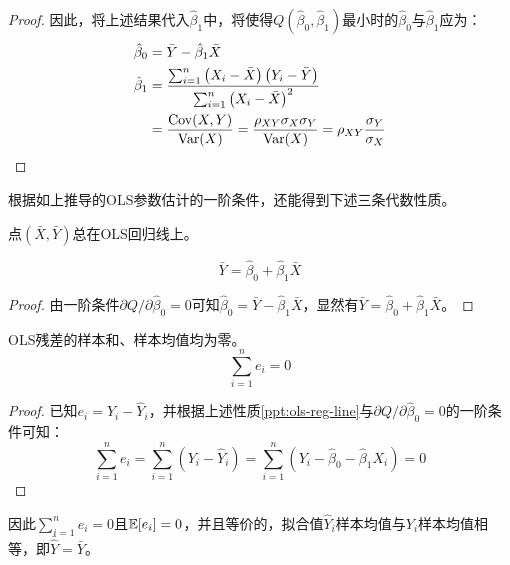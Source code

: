\documentclass[11pt]{article}
\begin{document}
\begin{proof}
因此，将上述结果代入$\hat{\beta}_1$中，将使得$Q(\hat{\beta}_0,\hat{\beta}_1)$最小时的$\hat{\beta}_0$与$\hat{\beta}_1$应为：
\begin{align*}
    \hat{\beta}_0 &= \bar{Y} - \hat{\beta}_1 \bar{X} \\
    \hat{\beta}_1 &= \frac{\sum_{i=1}^{n} \left(X_i - \bar{X}\right) \left(Y_i - \bar{Y}\right)}{\sum_{i=1}^{n} \left(X_i - \bar{X}\right)^2} \\
    &= \frac{\operatorname{Cov}(X,Y)}{\operatorname{Var}(X)} = \frac{\rho_{XY} \sigma_X \sigma_Y}{\operatorname{Var}(X)} = \rho_{XY} \frac{\sigma_Y}{\sigma_X}
\end{align*}
\end{proof}

根据如上推导的OLS参数估计的一阶条件，还能得到下述三条代数性质。

\begin{property}
    点$\left(\bar{X},\bar{Y}\right)$总在OLS回归线上。

    \begin{equation*}
        \bar{Y} = \hat{\beta}_0 + \hat{\beta}_1 \bar{X}
    \end{equation*}

    \begin{proof}
        由一阶条件$\partial Q/\partial \hat{\beta}_0 = 0$可知$\hat{\beta}_0 = \bar{Y} - \hat{\beta}_1 \bar{X}$，显然有$\bar{Y} = \hat{\beta}_0 + \hat{\beta}_1 \bar{X}$。
    \end{proof}
    \label{ppt:ols-reg-line}
\end{property}

\begin{property}
    OLS残差的样本和、样本均值均为零。
    \begin{equation*}
        \sum_{i=1}^{n} e_i = 0
    \end{equation*}

    \begin{proof}
        已知$e_i = Y_i - \hat{Y}_i$，并根据上述性质\ref{ppt:ols-reg-line}与$\partial Q / \partial \hat{\beta}_0 = 0$的一阶条件可知：
        \begin{equation*}
            \sum_{i=1}^{n} e_i 
            = \sum_{i=1}^{n} \left(Y_i - \hat{Y}_i\right)
            = \sum_{i=1}^{n} \left(Y_i - \hat{\beta}_0 - \hat{\beta}_1 X_i \right) = 0
        \end{equation*}
    \end{proof}

    因此$\sum_{i=1}^{n} e_i=0$且$\mathbb{E}[e_i]=0$，并且等价的，拟合值$\hat{Y}_i$样本均值与${Y_i}$样本均值相等，即$\bar{\hat{Y}}=\bar{Y}$。
    \label{ppt:ols-error-mean}
\end{property}
\end{document}
